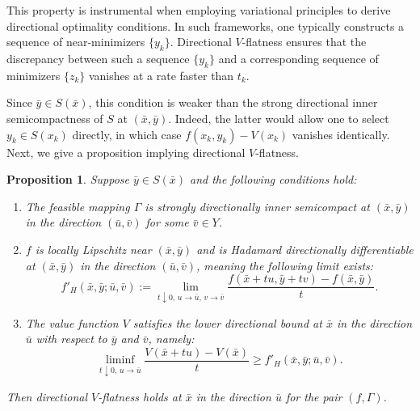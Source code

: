 \documentclass[12pt,twoside,reqno]{amsart}
\newtheorem{proposition}[theorem]{Proposition}
\theoremstyle{definition}
\numberwithin{equation}{section}
\begin{document}
This property is instrumental when employing variational principles to derive directional optimality conditions. In such frameworks, one typically constructs a sequence of near-minimizers $\{y_k\}$. Directional $V$-flatness ensures that the discrepancy between such a sequence $\{y_k\}$ and a corresponding sequence of minimizers $\{z_k\}$ vanishes at a rate faster than $t_k$. 

Since $\bar{y} \in S(\bar{x})$, this condition is weaker than the strong directional inner semicompactness of $S$ at $(\bar{x}, \bar{y})$. Indeed, the latter would allow one to select $y_k \in S(x_k)$ directly, in which case $f(x_k, y_k) - V(x_k)$ vanishes identically. %
Next, we give a proposition implying directional $V$-flatness. 

\begin{proposition}\label{prop: first_order_V_flatness_verification}
Suppose $\bar{y} \in S(\bar{x})$ and the following conditions hold:
\begin{enumerate}
    \item[\rm (i)] The feasible mapping $\Gamma$ is strongly directionally inner semicompact at $(\bar{x}, \bar{y})$ in the direction $(\bar{u}, \bar{v})$ for some $\bar{v} \in Y$. 
    
    \item[\rm (ii)] $f$ is locally Lipschitz near $(\bar{x}, \bar{y})$ and is Hadamard directionally differentiable at $(\bar{x}, \bar{y})$ in the direction $(\bar{u}, \bar{v})$, meaning the following limit exists:
    \begin{equation*}
        f'_H(\bar{x}, \bar{y}; \bar{u}, \bar{v}) := \lim_{t \downarrow 0, \, u \to \bar{u}, \, v \to \bar{v}} \frac{f(\bar{x} + t u, \bar{y} + t v) - f(\bar{x}, \bar{y})}{t}.
    \end{equation*}

    \item[\rm (iii)] The value function $V$ satisfies the lower directional bound at $\bar{x}$ in the direction $\bar{u}$ with respect to $\bar{y}$ and $\bar{v}$, namely:
    \begin{equation*}
        \liminf_{t \downarrow 0, \, u \to \bar{u}} \frac{V(\bar{x} + t u) - V(\bar{x})}{t} \ge f'_H(\bar{x}, \bar{y}; \bar{u}, \bar{v}).
    \end{equation*}
\end{enumerate}
Then directional $V$-flatness holds at $\bar{x}$ in the direction $\bar{u}$ for the pair $(f, \Gamma)$.
\end{proposition}
\end{document}
